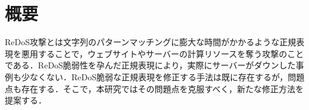 \documentclass[a4paper, 12pt, dvipdfmx, uplatex]{jsreport}
\begin{document}
\chapter*{概要}
ReDoS攻撃とは文字列のパターンマッチングに膨大な時間がかかるような正規表現を悪用することで，ウェブサイトやサーバーの計算リソースを奪う攻撃のことである．ReDoS脆弱性を孕んだ正規表現により，実際にサーバーがダウンした事例も少なくない．ReDoS脆弱な正規表現を修正する手法は既に存在するが，問題点も存在する．そこで，本研究ではその問題点を克服すべく，新たな修正方法を提案する．
\end{document}
